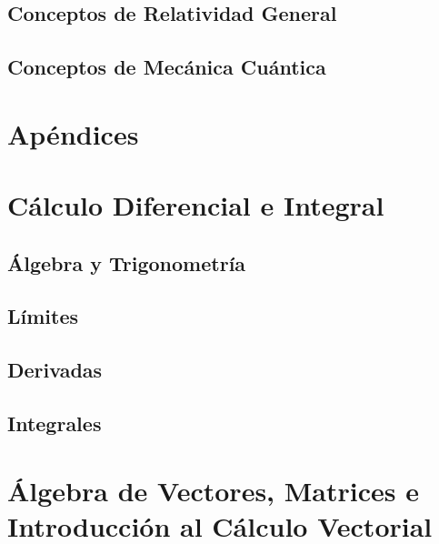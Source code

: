  \section{Conceptos de Relatividad General} 
 \section{Conceptos de Mecánica Cuántica}
\chapter{Ap\'endices}
\begin{appendices}
\chapter{C\'alculo Diferencial e Integral}
 \section{\'Algebra y Trigonometr\'ia}
 \section{L\'imites}
 \section{Derivadas}
 \section{Integrales}
\chapter{\'Algebra de Vectores, Matrices e Introducci\'on al C\'alculo Vectorial}
\end{appendices}

